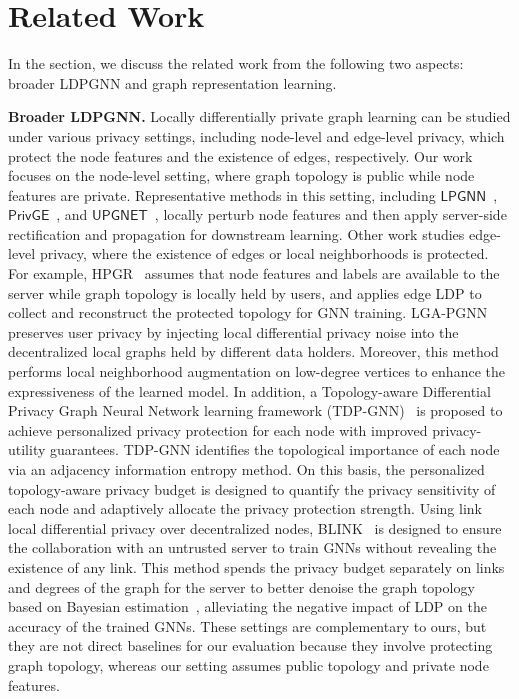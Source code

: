 \documentclass[conference,compsoc]{IEEEtran}
\theoremstyle{boldplain}
\theoremstyle{bolddefinition}
\theoremstyle{remark}
\newcommand{\mypara}[1]{\noindent\textbf{#1.}\xspace}
\newcommand{\ldpgnn}{LDPGNN\xspace}
\newcommand{\lpgnn}{\ensuremath{\mathsf{LPGNN}}\xspace}
\newcommand{\upgnet}{\ensuremath{\mathsf{UPGNET}}\xspace}
\newcommand{\privge}{\ensuremath{\mathsf{PrivGE}}\xspace}
\begin{document}
    







\section{Related Work}
\label{sec:related_work}


In the section, we discuss the related work from the following two aspects: broader \ldpgnn and graph representation learning.

\vspace{0.1cm}

\mypara{Broader \ldpgnn}
Locally differentially private graph learning can be studied under various privacy settings, including node-level and edge-level privacy, which protect the node features and the existence of edges, respectively.
Our work focuses on the node-level setting, where graph topology is public while node features are private.
Representative methods in this setting, including \lpgnn~\cite{lpgNN}, \privge~\cite{privge}, and \upgnet~\cite{upgnet-cite}, locally perturb node features and then apply server-side rectification and propagation for downstream learning. 
Other work studies edge-level privacy, where the existence of edges or local neighborhoods is protected.
\textcolor{purple!80}{For example, HPGR~\cite{xie2025hpgr} assumes that node features and labels are available to the server while graph topology is locally held by users, and applies edge LDP to collect and reconstruct the protected topology for GNN training. }
LGA-PGNN~\cite{pei2024lgapgnn} preserves user privacy by injecting local differential privacy noise into the decentralized local graphs held by different data holders. 
Moreover, this method performs local neighborhood augmentation on low-degree vertices to enhance the expressiveness of the learned model.
In addition, a Topology-aware Differential Privacy Graph Neural Network learning framework (TDP-GNN)~\cite{lei2025tdpgnn} is proposed to achieve personalized privacy protection for each node with improved privacy-utility guarantees.
TDP-GNN identifies the topological importance of each node via an adjacency information entropy method. 
On this basis, the personalized topology-aware privacy budget is designed to quantify the privacy sensitivity of each node and adaptively allocate the privacy protection strength. 
Using link local differential privacy over decentralized nodes, BLINK~\cite{zhu2023blink} is designed to ensure the collaboration with an untrusted server to train GNNs without revealing the existence of any link.
This method spends the privacy budget separately on links and degrees of the graph for the server to better denoise the graph topology based on Bayesian estimation~\cite{haug2012bayesian}, alleviating the negative impact of LDP on the accuracy of the trained GNNs. 
\textcolor{purple!80}{These settings are complementary to ours, but they are not direct baselines for our evaluation because they involve protecting graph topology, whereas our setting assumes public topology and private node features.}
\end{document}
